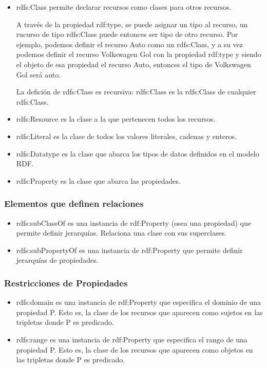 \begin{itemize}
  \item 
    rdfs:Class permite declarar recursos como clases para otros recursos. 
    
    A través de la propiedad rdf:type, se puede asignar un tipo al recurso, un rucurso de tipo rdfs:Class puede entonces ser tipo de otro recurso. 
    Por ejemplo, podemos definir el recurso Auto como un rdfs:Class, y a su vez podemos definir el recurso Volkswagen Gol con la propiedad rdf:type 
    y siendo el objeto de esa propiedad el recurso Auto, entonces el tipo de Volkswagen Gol será auto.
    
    La defición de rdfs:Class es recursiva: rdfs:Class es la rdfs:Class de cualquier rdfs:Class.
  \item
    rdfs:Resource es la clase a la que pertenecen todos los recursos.
  \item
    rdfs:Literal es la clase de todos los valores literales, cadenas y enteros.
  \item
    rdfs:Datatype es la clase que abarca los tipos de datos definidos en el modelo RDF.
  \item
    rdfs:Property es la clase que abarca las propiedades.
\end{itemize}

\subsubsection{Elementos que definen relaciones}

\begin{itemize}
  \item rdfs:subClassOf es una instancia de rdf:Property (osea una propiedad) que permite definir jerarquías. Relaciona una clase con sus superclases.

  \item rdfs:subPropertyOf es una instancia de rdf:Property que permite definir jerarquías de propiedades.
\end{itemize}
    
\subsubsection{Restricciones de Propiedades}

\begin{itemize}
   \item rdfs:domain es una instancia de rdf:Property que especifica el dominio de una propiedad P. Esto es, la clase de los recursos que aparecen como sujetos en las tripletas donde P es predicado.

   \item rdfs:range es una instancia de rdf:Property que especifica el rango de una propiedad P. Esto es, la clase de los recursos que aparecen como objetos en las tripletas donde P es predicado.
    
\end{itemize}

